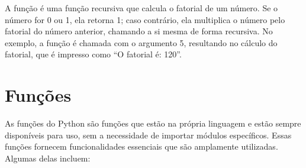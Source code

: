 \documentclass[letterpaper,10pt,english]{jupyterBook}
\begin{document}
\begin{sphinxVerbatim}[commandchars=\\\{\}]
   
\end{sphinxVerbatim}

\sphinxAtStartPar
A função  é uma função recursiva que calcula o fatorial de um número. Se o número for 0 ou 1, ela retorna 1; caso contrário, ela multiplica o número pelo fatorial do número anterior, chamando a si mesma de forma recursiva. No exemplo, a função é chamada com o argumento 5, resultando no cálculo do fatorial, que é impresso como “O fatorial é: 120”.


\section{Funções }
\label{\detokenize{chapters/ch5/ch5:funcoes-built-in}}
\sphinxAtStartPar
As funções  do Python são funções que estão na própria linguagem e estão sempre disponíveis para uso, sem a necessidade de importar módulos específicos. Essas funções fornecem funcionalidades essenciais que são amplamente utilizadas. Algumas delas incluem:
\end{document}
